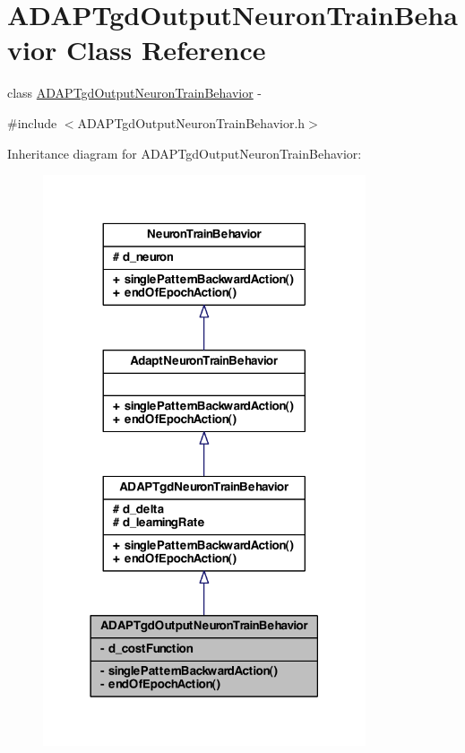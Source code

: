 \hypertarget{class_a_d_a_p_tgd_output_neuron_train_behavior}{
\section{ADAPTgdOutputNeuronTrainBehavior Class Reference}
\label{class_a_d_a_p_tgd_output_neuron_train_behavior}
}


class \hyperlink{class_a_d_a_p_tgd_output_neuron_train_behavior}{ADAPTgdOutputNeuronTrainBehavior} -\/  




{\ttfamily \#include $<$ADAPTgdOutputNeuronTrainBehavior.h$>$}



Inheritance diagram for ADAPTgdOutputNeuronTrainBehavior:
\nopagebreak
\begin{figure}[H]
\begin{center}
\leavevmode
\includegraphics[width=270pt]{class_a_d_a_p_tgd_output_neuron_train_behavior__inherit__graph}
\end{center}
\end{figure}


